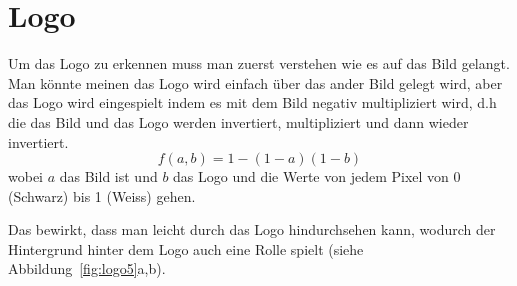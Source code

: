 \documentclass[12pt,a4paper]{report}
\begin{document}
\section{Logo}
Um das Logo zu erkennen muss man zuerst verstehen wie es auf das Bild gelangt.
Man könnte meinen das Logo wird einfach über das ander Bild gelegt wird,
aber das Logo wird eingespielt indem es mit dem Bild negativ multipliziert wird,
d.h die das Bild und das Logo werden invertiert, multipliziert und dann wieder invertiert.\cite{wiki:blend}
\[f(a,b) = 1 - (1-a)(1-b)\]
wobei $a$ das Bild ist und $b$ das Logo und die Werte von jedem Pixel von 0 (Schwarz) bis 1 (Weiss) gehen.

Das bewirkt, dass man leicht durch das Logo hindurchsehen kann,
wodurch der Hintergrund hinter dem Logo auch eine Rolle spielt (siehe Abbildung~\ref{fig:logo5}a,b).
\begin{figure}[h]%
    \centering
    \qquad
    \qquad
    \qquad

\end{figure}
\end{document}
